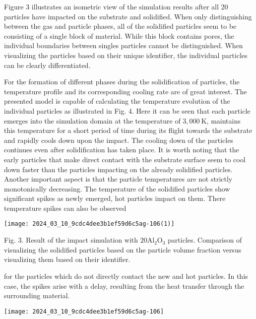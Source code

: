 \documentclass[10pt]{article}
\begin{document}
Figure 3 illustrates an isometric view of the simulation results after all 20 particles have impacted on the substrate and solidified. When only distinguishing between the gas and particle phases, all of the solidified particles seem to be consisting of a single block of material. While this block contains pores, the individual boundaries between singles particles cannot be distinguished. When visualizing the particles based on their unique identifier, the individual particles can be clearly differentiated.

For the formation of different phases during the solidification of particles, the temperature profile and its corresponding cooling rate are of great interest. The presented model is capable of calculating the temperature evolution of the individual particles as illustrated in Fig. 4. Here it can be seen that each particle emerges into the simulation domain at the temperature of $3,000 \mathrm{~K}$, maintains this temperature for a short period of time during its flight towards the substrate and rapidly cools down upon the impact. The cooling down of the particles continues even after solidification has taken place. It is worth noting that the early particles that make direct contact with the substrate surface seem to cool down faster than the particles impacting on the already solidified particles. Another important aspect is that the particle temperatures are not strictly monotonically decreasing. The temperature of the solidified particles show significant spikes as newly emerged, hot particles impact on them. There temperature spikes can also be observed

\begin{center}
\texttt{[image: 2024\_03\_10\_9cdc4dee3b1ef59d6c5ag-106(1)]}
\end{center}

Fig. 3. Result of the impact simulation with $20 \mathrm{Al}_{2} \mathrm{O}_{3}$ particles. Comparison of visualizing the solidified particles based on the particle volume fraction versus visualizing them based on their identifier.

for the particles which do not directly contact the new and hot particles. In this case, the spikes arise with a delay, resulting from the heat transfer through the surrounding material.

\begin{center}
\texttt{[image: 2024\_03\_10\_9cdc4dee3b1ef59d6c5ag-106]}
\end{center}
\end{document}

